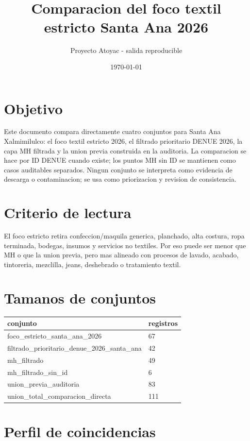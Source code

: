 \documentclass[11pt]{article}
\title{Comparacion del foco textil estricto Santa Ana 2026}
\author{Proyecto Atoyac - salida reproducible}
\date{\today}
\begin{document}
\maketitle

\section{Objetivo}

Este documento compara directamente cuatro conjuntos para Santa Ana Xalmimilulco: el foco textil estricto 2026, el filtrado prioritario DENUE 2026, la capa MH filtrada y la union previa construida en la auditoria. La comparacion se hace por ID DENUE cuando existe; los puntos MH sin ID se mantienen como casos auditables separados. Ningun conjunto se interpreta como evidencia de descarga o contaminacion; se usa como priorizacion y revision de consistencia.

\section{Criterio de lectura}

El foco estricto retira confeccion/maquila generica, planchado, alta costura, ropa terminada, bodegas, insumos y servicios no textiles. Por eso puede ser menor que MH o que la union previa, pero mas alineado con procesos de lavado, acabado, tintoreria, mezclilla, jeans, deshebrado o tratamiento textil.

\section{Tamanos de conjuntos}

\begin{tabular}{ll}
\toprule
conjunto & registros \\
\midrule
foco\_estricto\_santa\_ana\_2026 & 67 \\
filtrado\_prioritario\_denue\_2026\_santa\_ana & 42 \\
mh\_filtrado & 49 \\
mh\_filtrado\_sin\_id & 6 \\
union\_previa\_auditoria & 83 \\
union\_total\_comparacion\_directa & 111 \\
\bottomrule
\end{tabular}

\section{Perfil de coincidencias}
\end{document}
